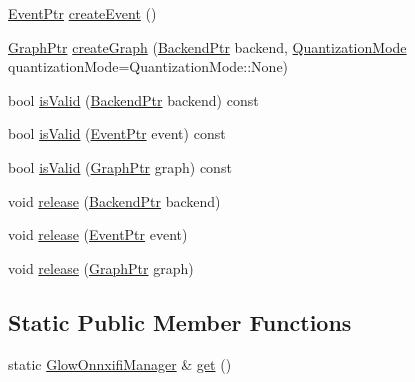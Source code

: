 \begin{DoxyCompactItemize}
\item 
\hyperlink{classglow_1_1onnxifi_1_1_event}{Event\+Ptr} \hyperlink{classglow_1_1onnxifi_1_1_glow_onnxifi_manager_aa4e8c1c658fe5053daea441809b91d14}{create\+Event} ()
\item 
\hyperlink{classglow_1_1onnxifi_1_1_graph}{Graph\+Ptr} \hyperlink{classglow_1_1onnxifi_1_1_glow_onnxifi_manager_ada8d8295e1d7471244a16e72f0aba40d}{create\+Graph} (\hyperlink{classglow_1_1onnxifi_1_1_backend}{Backend\+Ptr} backend, \hyperlink{structglow_1_1_precision_configuration_a9a40e5e2126e4c6f3e8fe3bab25ff12c}{Quantization\+Mode} quantization\+Mode=Quantization\+Mode\+::\+None)
\item 
bool \hyperlink{classglow_1_1onnxifi_1_1_glow_onnxifi_manager_a516210ca277b60710c368ec6c88a8338}{is\+Valid} (\hyperlink{classglow_1_1onnxifi_1_1_backend}{Backend\+Ptr} backend) const
\item 
bool \hyperlink{classglow_1_1onnxifi_1_1_glow_onnxifi_manager_ac8ad36eb469b6139f260ff6d3c40565f}{is\+Valid} (\hyperlink{classglow_1_1onnxifi_1_1_event}{Event\+Ptr} event) const
\item 
bool \hyperlink{classglow_1_1onnxifi_1_1_glow_onnxifi_manager_aa472c562f8a41fcd701c0fc201ee9ff4}{is\+Valid} (\hyperlink{classglow_1_1onnxifi_1_1_graph}{Graph\+Ptr} graph) const
\item 
void \hyperlink{classglow_1_1onnxifi_1_1_glow_onnxifi_manager_a193268a2c7917edfea3d3731e4f47ee2}{release} (\hyperlink{classglow_1_1onnxifi_1_1_backend}{Backend\+Ptr} backend)
\item 
void \hyperlink{classglow_1_1onnxifi_1_1_glow_onnxifi_manager_a0849c75dea0e13efe9296cb609450519}{release} (\hyperlink{classglow_1_1onnxifi_1_1_event}{Event\+Ptr} event)
\item 
void \hyperlink{classglow_1_1onnxifi_1_1_glow_onnxifi_manager_a51e435a20546907964cef234fbe45bb8}{release} (\hyperlink{classglow_1_1onnxifi_1_1_graph}{Graph\+Ptr} graph)
\end{DoxyCompactItemize}
\subsection*{Static Public Member Functions}
\begin{DoxyCompactItemize}
\item 
static \hyperlink{classglow_1_1onnxifi_1_1_glow_onnxifi_manager}{Glow\+Onnxifi\+Manager} \& \hyperlink{classglow_1_1onnxifi_1_1_glow_onnxifi_manager_a760b909b413290c2e910c73efde50e6c}{get} ()
\end{DoxyCompactItemize}


